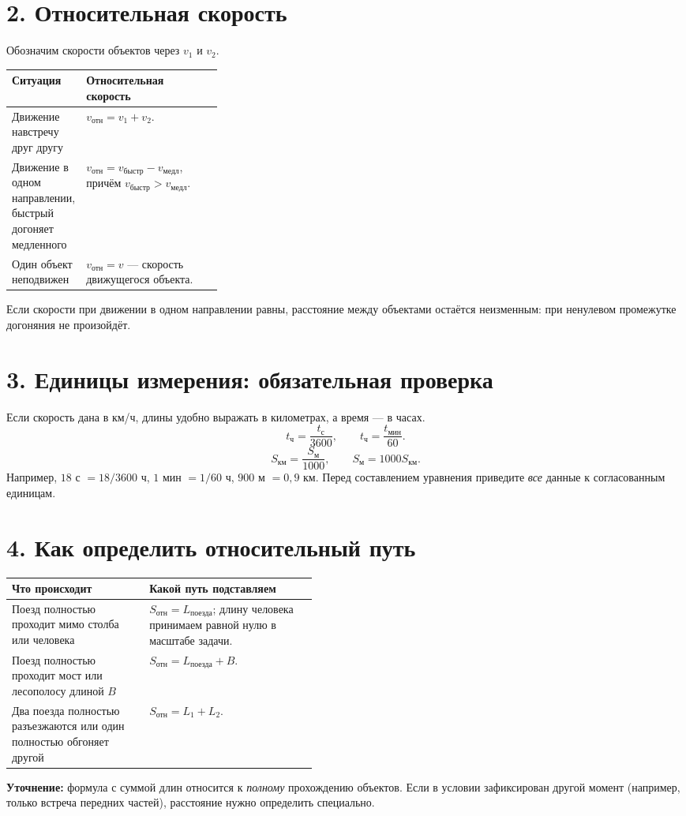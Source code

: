 \documentclass[a4paper,12pt]{article}
\newcommand{\key}[1]{\textcolor{darkaccent}{\textbf{#1}}}
\begin{document}
\section*{2. Относительная скорость}
Обозначим скорости объектов через $v_1$ и $v_2$.
\begin{center}
\begin{tabularx}{\linewidth}{@{}p{0.31\linewidth}Y@{}}
\toprule
\textbf{Ситуация} & \textbf{Относительная скорость} \\
\midrule
Движение навстречу друг другу & $v_{\text{отн}}=v_1+v_2$.\\
Движение в одном направлении, быстрый догоняет медленного & $v_{\text{отн}}=v_{\text{быстр}}-v_{\text{медл}}$, причём $v_{\text{быстр}}>v_{\text{медл}}$.\\
Один объект неподвижен & $v_{\text{отн}}=v$ --- скорость движущегося объекта.\\
\bottomrule
\end{tabularx}
\end{center}
Если скорости при движении в одном направлении равны, расстояние между объектами остаётся неизменным: при ненулевом промежутке догоняния не произойдёт.

\section*{3. Единицы измерения: обязательная проверка}
Если скорость дана в км/ч, длины удобно выражать в километрах, а время --- в часах.
\[
\boxed{\displaystyle t_{\text{ч}}=\frac{t_{\text{с}}}{3600}},\qquad
\boxed{\displaystyle t_{\text{ч}}=\frac{t_{\text{мин}}}{60}}.
\]
\[
\boxed{\displaystyle S_{\text{км}}=\frac{S_{\text{м}}}{1000}},\qquad
\boxed{\displaystyle S_{\text{м}}=1000S_{\text{км}}}.
\]
Например, $18$ с $=18/3600$ ч, $1$ мин $=1/60$ ч, $900$ м $=0{,}9$ км. Перед составлением уравнения приведите \emph{все} данные к согласованным единицам.

\clearpage
\section*{4. Как определить относительный путь}
\begin{center}
\begin{tabularx}{\linewidth}{@{}p{0.45\linewidth}Y@{}}
\toprule
\textbf{Что происходит} & \textbf{Какой путь подставляем} \\
\midrule
Поезд полностью проходит мимо столба или человека & $S_{\text{отн}}=L_{\text{поезда}}$; длину человека принимаем равной нулю в масштабе задачи.\\
Поезд полностью проходит мост или лесополосу длиной $B$ & $S_{\text{отн}}=L_{\text{поезда}}+B$.\\
Два поезда полностью разъезжаются или один полностью обгоняет другой & $S_{\text{отн}}=L_1+L_2$.\\
\bottomrule
\end{tabularx}
\end{center}
\key{Уточнение:} формула с суммой длин относится к \emph{полному} прохождению объектов. Если в условии зафиксирован другой момент (например, только встреча передних частей), расстояние нужно определить специально.
\end{document}
